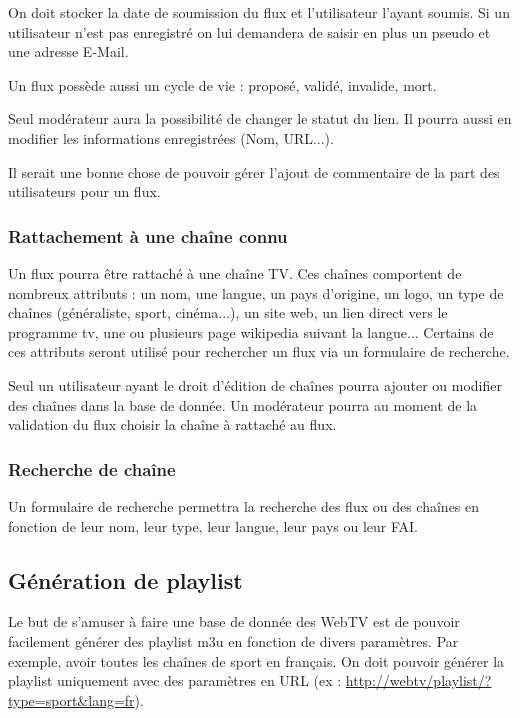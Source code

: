 \documentclass[10pt,a4paper]{article}
\begin{document}
On doit stocker la date de soumission du flux et l'utilisateur l'ayant soumis. Si un utilisateur n'est pas enregistré on lui demandera de saisir en plus un pseudo et une adresse E-Mail.

Un flux possède aussi un cycle de vie : proposé, validé, invalide, mort.

Seul modérateur aura la possibilité de changer le statut du lien. Il pourra aussi en modifier les informations enregistrées (Nom, URL...).

Il serait une bonne chose de pouvoir gérer l'ajout de commentaire de la part des utilisateurs pour un flux.

\subsubsection{Rattachement à une chaîne connu}

Un flux pourra être rattaché à une chaîne TV. Ces chaînes comportent de nombreux attributs : un nom, une langue, un pays d'origine, un logo, un type de chaînes (généraliste, sport, cinéma...), un site web, un lien direct vers le programme tv, une ou plusieurs page wikipedia suivant la langue... Certains de ces attributs seront utilisé pour rechercher un flux via un formulaire de recherche.

Seul un utilisateur ayant le droit d'édition de chaînes pourra ajouter ou modifier des chaînes dans la base de donnée. Un modérateur pourra au moment de la validation du flux choisir la chaîne à rattaché au flux.

\subsubsection{Recherche de chaîne}

Un formulaire de recherche permettra la recherche des flux ou des chaînes en fonction de leur nom, leur type, leur langue, leur pays ou leur FAI.

\subsection{Génération de playlist}

Le but de s'amuser à faire une base de donnée des WebTV est de pouvoir facilement générer des playlist m3u en fonction de divers paramètres. Par exemple, avoir toutes les chaînes de sport en français. On doit pouvoir générer la playlist uniquement avec des paramètres en URL (ex : \url{http://webtv/playlist/?type=sport&lang=fr}).
\end{document}
